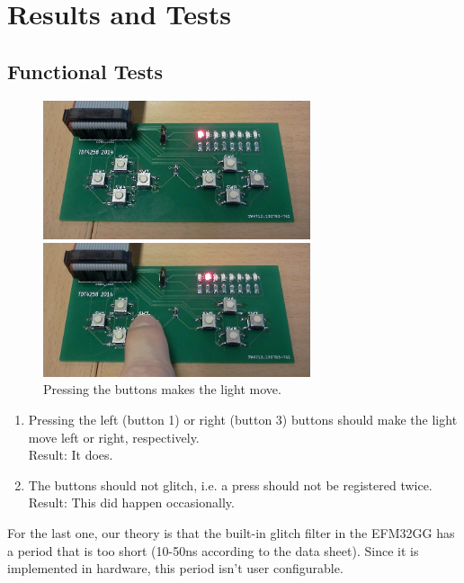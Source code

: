 \documentclass[a4paper, 12pt]{article}
\begin{document}
\section{Results and Tests} %
\label{sec:results_and_tests}
	\subsection{Functional Tests} %
	\label{sub:functional_tests}
        \begin{figure}[!ht]
        \centerline{\includegraphics[width=0.7\textwidth]{IMG064}}
        \centerline{\includegraphics[width=0.7\textwidth]{IMG065}}
        \caption{Pressing the buttons makes the light move.}
        \label{fig:buttons}
        \end{figure}
		\begin{enumerate}
			\item Pressing the left (button 1) or right (button 3) buttons should make the light move left or right, respectively. \\
				  Result: It does.
			\item The buttons should not glitch, i.e. a press should not be registered twice.\\
				  Result: This did happen occasionally.
		\end{enumerate}
		For the last one, our theory is that the built-in glitch filter in the EFM32GG has a period that is too short (10-50ns according to the data sheet). Since it is implemented in hardware, this period isn't user configurable.
\end{document}
